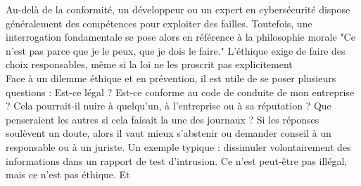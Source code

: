 \documentclass{article}
\begin{document}
Au-delà de la conformité, un développeur ou un expert en cybersécurité dispose
généralement des compétences pour exploiter des failles. Toutefois, une interrogation
fondamentale se pose alors en référence à la philosophie morale
"Ce n’est pas parce que je le
peux, que je dois le faire." L’éthique exige de faire des choix responsables, même si la loi ne les
proscrit pas explicitement\\

Face à un dilemme éthique et en prévention, il est utile de se poser plusieurs questions : Est-ce
légal ? Est-ce conforme au code de conduite de mon entreprise ? Cela pourrait-il nuire à
quelqu’un, à l’entreprise ou à sa réputation ? Que penseraient les autres si cela faisait la une
des journaux ?
Si les réponses soulèvent un doute, alors il vaut mieux s’abstenir ou demander conseil à un
responsable ou à un juriste. Un exemple typique : dissimuler volontairement des informations
dans un rapport de test d’intrusion. Ce n’est peut-être pas illégal, mais ce n’est pas éthique. Et
\end{document}
